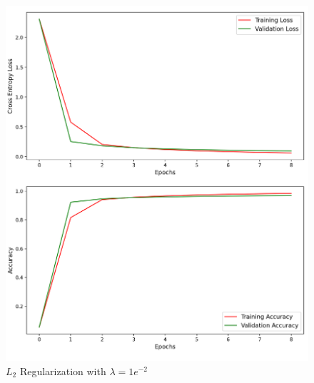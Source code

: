 \begin{figure}[H]
	\centering
	\includegraphics[width=1.0\textwidth]{./images/l2_e2.png}
	\caption{$L_2$ Regularization with $\lambda = 1e^{-2}$}
	\label{fig:l2_1e2}
\end{figure}

